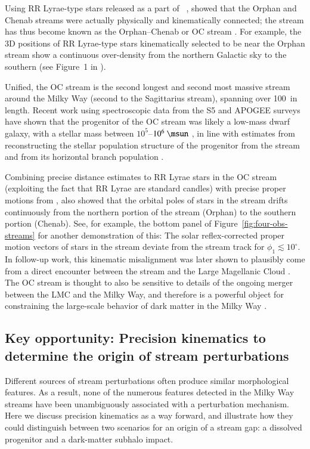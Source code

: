 \documentclass[final,5p,times,twocolumn,authoryear]{elsarticle}
\begin{document}
Using RR Lyrae-type stars released as a part of \gaia\ , \citet{koposov:2019}
showed that the Orphan and Chenab streams were actually physically and kinematically
connected; the stream has thus become known as the Orphan--Chenab or OC stream
\citep[see also][]{fardal:2019}.
For example, the 3D positions of RR Lyrae-type stars kinematically selected to be near
the Orphan stream show a continuous over-density from the northern Galactic sky to the
southern (see Figure~1 in \citealt{koposov:2019}).

Unified, the OC stream is the second longest and second most massive stream around the
Milky Way (second to the Sagittarius stream), spanning over 100~\kpc in length.
Recent work using spectroscopic data from the S5 and APOGEE surveys have shown that the
progenitor of the OC stream was likely a low-mass dwarf galaxy, with a stellar mass
between $10^5$--$10^6~\unit{\msun}$ \citep{koposov:2023, hawkins:2023}, in line with
estimates from reconstructing the stellar population structure of the progenitor from
the stream \citep{mendelsohn:2022} and from its horizontal branch population \citep{prudil:2021}.

Combining precise distance estimates to RR Lyrae stars in the OC stream (exploiting the
fact that RR Lyrae are standard candles) with precise proper motions from \gaia,
\citet{koposov:2019} also showed that the orbital poles of stars in the stream drifts
continuously from the northern portion of the stream (Orphan) to the southern portion
(Chenab).
See, for example, the bottom panel of Figure~\ref{fig:four-obs-streams} for another
demonstration of this: The solar reflex-corrected proper motion vectors of stars in the
stream deviate from the stream track for $\phi_1 \lesssim 10^\circ$.
In follow-up work, this kinematic misalignment was later shown to plausibly come from a
direct encounter between the stream and the Large Magellanic Cloud \citep{erkal:2019}.
The OC stream is thought to also be sensitive to details of the ongoing merger
between the LMC and the Milky Way, and therefore is a powerful object for constraining
the large-scale behavior of dark matter in the Milky Way \citep{lilleengen:2023}.


\subsection{Key opportunity: Precision kinematics to determine the origin of stream perturbations}
\label{sec:xkinematics}
Different sources of stream perturbations often produce similar morphological features.
As a result, none of the numerous features detected in the Milky Way streams have been unambiguously associated with a perturbation mechanism.
Here we discuss precision kinematics as a way forward, and illustrate how they could distinguish between two scenarios for an origin of a stream gap: a dissolved progenitor and a dark-matter subhalo impact.
\end{document}
